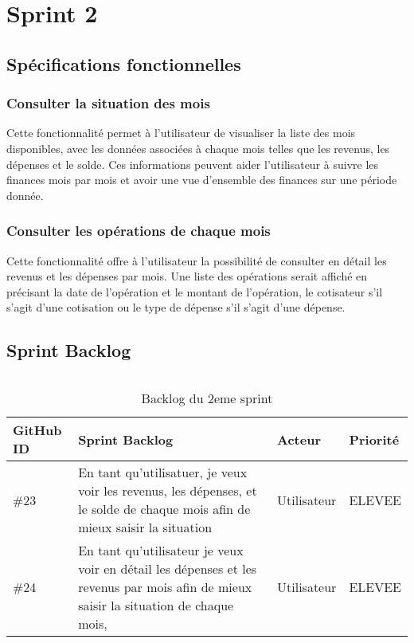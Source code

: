 \section{Sprint 2}
\subsection{Spécifications fonctionnelles}
\subsubsection{Consulter la situation des mois}
Cette fonctionnalité permet à l'utilisateur de visualiser la liste des mois disponibles, avec les données associées à chaque mois telles que les revenus, les dépenses et le solde. Ces informations peuvent aider l'utilisateur à suivre les finances mois par mois et avoir une vue d'ensemble des finances sur une période donnée.
\subsubsection{Consulter les opérations de chaque mois}
Cette fonctionnalité offre à l'utilisateur la possibilité de consulter en détail les revenus et les dépenses par mois. Une liste des opérations serait affiché en précisant la date de l'opération et le montant de l'opération, le cotisateur s'il s'agit d'une cotisation ou le type de dépense s'il s'agit d'une dépense.

\subsection{Sprint Backlog}

$  $

\begin{center}
  \begin{table}[h!]
    \begin{tabular}{ | m{2cm} | m{7cm}| m{3cm} | m{2cm} |} 
      \hline
      GitHub ID & Sprint Backlog & Acteur & Priorité \\ [0.5ex] 
      \hline\hline
      \#23 & En tant qu'utilisatuer, je veux voir les revenus, les dépenses, et le solde de chaque mois afin de mieux saisir la situation & Utilisateur & ELEVEE \\
      \hline
      \#24  & En tant qu'utilisateur je veux voir en détail les dépenses et les revenus par mois afin de mieux saisir la situation de chaque mois, & Utilisateur & ELEVEE \\
      \hline
     \end{tabular}
     \caption{Backlog du 2eme sprint}
  \end{table}
\end{center}
\newpage
